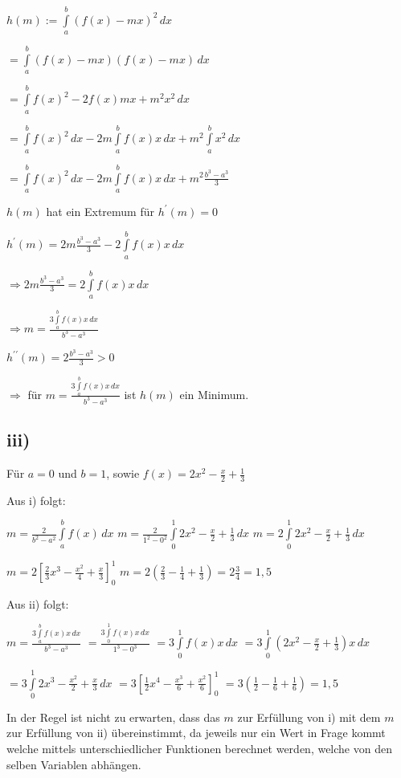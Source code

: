 $ h(m) := \int\limits_{a}^{b}(f(x)-mx)^{2}\,dx$

$ = \int\limits_{a}^{b}(f(x)-mx)(f(x)-mx)\,dx$


$ = \int\limits_{a}^{b}f(x)^{2}-2f(x)mx+m^{2}x^{2}\,dx$

$ = \int\limits_{a}^{b}f(x)^{2}\,dx 
-2m\int\limits_{a}^{b}f(x)x\,dx 
+ m^{2}\int\limits_{a}^{b}x^{2}\,dx$

$ = \int\limits_{a}^{b}f(x)^{2}\,dx 
-2m\int\limits_{a}^{b}f(x)x\,dx 
+ m^{2}\frac{b^{3}-a^{3}}{3}$

$h(m)$ hat ein Extremum für $h^{\prime}(m) = 0$

$ h^{\prime}(m) = 2m\frac{b^{3}-a^{3}}{3} - 2\int\limits_{a}^{b}f(x)x\,dx $

$\Rightarrow 2m\frac{b^{3}-a^{3}}{3} =  2\int\limits_{a}^{b}f(x)x\,dx $

$\Rightarrow m =  \frac{3\int\limits_{a}^{b}f(x)x\,dx}{b^{3}-a^{3}} $

$h^{\prime\prime}(m) = 2\frac{b^{3}-a^{3}}{3} > 0$

$\Rightarrow$ für $m = \frac{3\int\limits_{a}^{b}f(x)x\,dx}{b^{3}-a^{3}}$ ist $h(m)$
ein Minimum.


\subsection*{iii)}

Für $a = 0$ und $b = 1$, sowie $f(x) = 2x^{2}-\frac{x}{2} + \frac{1}{3}$ 

Aus i) folgt:

$m = \frac{2}{b^{2}-a^{2}} \int\limits_{a}^{b}f(x) \,dx $
$m = \frac{2}{1^{2}-0^{2}} \int\limits_{0}^{1}2x^{2}-\frac{x}{2} + \frac{1}{3} \,dx$
$m = 2 \int\limits_{0}^{1}2x^{2}-\frac{x}{2} + \frac{1}{3} \,dx $

$m = 2 \left[\frac{2}{3}x^{3} - \frac{x^{2}}{4} + \frac{x}{3}\right]_{0}^{1} $
$m = 2 (\frac{2}{3} - \frac{1}{4} + \frac{1}{3}) = 2 \frac{3}{4} = 1,5 $




Aus ii) folgt:

$m = \frac{3\int\limits_{a}^{b}f(x)x\,dx}{b^{3}-a^{3}} $
$ = \frac{3\int\limits_{0}^{1}f(x)x\,dx}{1^{3}-0^{3}} $
$ = 3\int\limits_{0}^{1}f(x)x\,dx$
$ = 3\int\limits_{0}^{1}(2x^{2}-\frac{x}{2} + \frac{1}{3})x\,dx  $

$ = 3\int\limits_{0}^{1}2x^{3}-\frac{x^{2}}{2} + \frac{x}{3}\,dx  $
$ = 3 \left[\frac{1}{2}x^{4}-\frac{x^{3}}{6} + \frac{x^{2}}{6}\right]^{1}_{0} $
$ = 3 (\frac{1}{2}-\frac{1}{6} + \frac{1}{6}) = 1,5$


In der Regel ist nicht zu erwarten, dass das $m$ zur Erfüllung von i) mit dem $m$ zur Erfüllung von ii) übereinstimmt, da jeweils nur ein Wert in Frage kommt welche mittels unterschiedlicher Funktionen berechnet werden, welche von den selben Variablen abhängen.